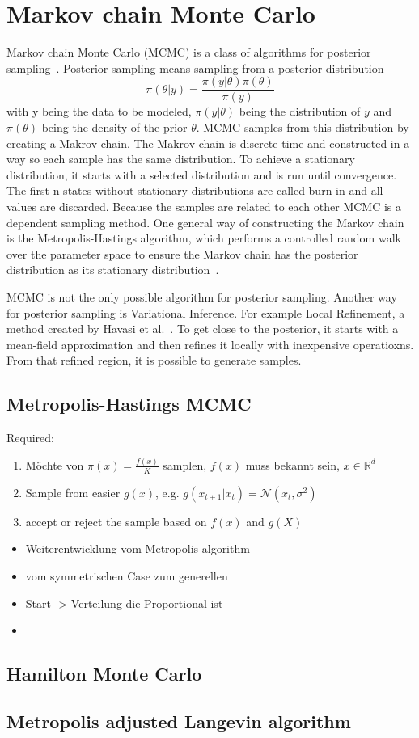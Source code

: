 \section{Markov chain Monte Carlo}
Markov chain Monte Carlo (MCMC) is a class of algorithms 
for posterior sampling~\cite{wang2020brief}. 
Posterior sampling means sampling from a posterior distribution \[
\pi(\theta|y)=\frac{\pi(y|\theta)\pi(\theta)}{\pi(y)}
\]
with y being the data to be modeled, $\pi(y|\theta)$ 
being the distribution of $y$ and $\pi(\theta)$ 
being the density of the prior $\theta$.
MCMC samples from this distribution by creating a Makrov chain. 
The Makrov chain is discrete-time and constructed in a way so each sample 
has the same distribution. To achieve a stationary distribution, 
it starts with a selected distribution and is run until convergence. 
The first n states without stationary distributions are called 
burn-in and all values are discarded. Because the samples are 
related to each other MCMC is a dependent sampling method.
One general way of constructing the Markov chain is the 
Metropolis-Hastings algorithm, which performs a controlled 
random walk over the parameter space to ensure the Markov
chain has the posterior distribution as its stationary distribution~\cite{wang2020brief}. 

MCMC is not the only possible algorithm for posterior sampling. 
Another way for posterior sampling is Variational Inference. 
For example Local Refinement, a method created by 
Havasi et al.~\cite{havasi2021sampling}. 
To get close to the posterior, 
it starts with a mean-field approximation and then refines it 
locally with inexpensive operatioxns. From that refined region, 
it is possible to generate samples.
\subsection{Metropolis-Hastings MCMC}
Required: 
\begin{enumerate}
    \item Möchte von $\pi(x) = \frac{f(x)}{K}$ samplen, $f(x)$ muss bekannt sein, $x\in\mathbb{R}^d$
    \item Sample from easier $g(x)$, e.g. $g(x_{t+1}|x_t)=\mathcal{N}(x_t, \sigma^2)$
    \item accept or reject the sample based on $f(x)$ and $g(X)$
\end{enumerate}
\begin{itemize}
    \item Weiterentwicklung vom Metropolis algorithm~\cite{metropolis1953}
    \item vom symmetrischen Case zum generellen
    \item Start -> Verteilung die Proportional ist 
    \item 
\end{itemize}
\subsection{Hamilton Monte Carlo}

\subsection{Metropolis adjusted Langevin algorithm}
